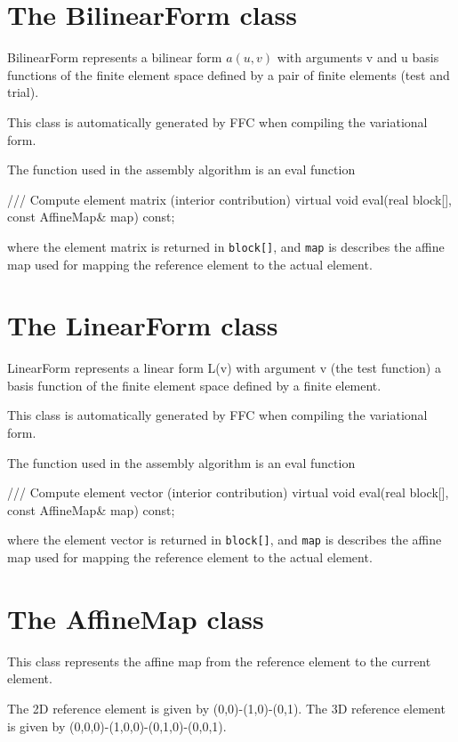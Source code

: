 \section{The BilinearForm class}

BilinearForm represents a bilinear form $a(u,v)$ with arguments v
and u basis functions of the finite element space defined by a
pair of finite elements (test and trial).

This class is automatically generated by FFC when compiling the 
variational form. 

The function used in the assembly algorithm is an eval function 
\begin{code}
/// Compute element matrix (interior contribution)
virtual void eval(real block[], const AffineMap& map) const;
\end{code}    
where the element matrix is returned in  
\texttt{block[]}, and \texttt{map} is describes the affine map used 
for mapping the reference element to the actual element. 

\section{The LinearForm class}

LinearForm represents a linear form L(v) with argument v (the
test function) a basis function of the finite element space
defined by a finite element.

This class is automatically generated by FFC when compiling the 
variational form. 

The function used in the assembly algorithm is an eval function 
\begin{code}
/// Compute element vector (interior contribution)
virtual void eval(real block[], const AffineMap& map) const;
\end{code}    
where the element vector is returned in  
\texttt{block[]}, and \texttt{map} is describes the affine map used 
for mapping the reference element to the actual element. 

\section{The AffineMap class}

This class represents the affine map from the reference element to
the current element.

The 2D reference element is given by (0,0)-(1,0)-(0,1).
The 3D reference element is given by (0,0,0)-(1,0,0)-(0,1,0)-(0,0,1).

